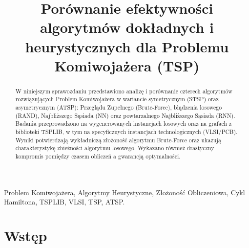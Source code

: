 \documentclass[conference]{IEEEtran}
\begin{document}
    
    \title{Porównanie efektywności algorytmów dokładnych i heurystycznych dla Problemu Komiwojażera (TSP)}
    \author{
        }
    \maketitle
    \thispagestyle{empty}
    \pagestyle{plain}


    \begin{abstract}
        W niniejszym sprawozdaniu przedstawiono analizę i porównanie czterech algorytmów rozwiązujących Problem Komiwojażera w wariancie symetrycznym (STSP) oraz asymetrycznym (ATSP): Przeglądu Zupełnego (Brute-Force), błądzenia losowego (RAND), Najbliższego Sąsiada (NN) oraz powtarzalnego Najbliższego Sąsiada (RNN). Badania przeprowadzono na wygenerowanych instancjach losowych oraz na grafach z biblioteki TSPLIB, w tym na specyficznych instancjach technologicznych (VLSI/PCB). Wyniki potwierdzają wykładniczą złożoność algorytmu Brute-Force oraz ukazują charakterystykę zbieżności algorytmu losowego. Wykazano również drastyczny kompromis pomiędzy czasem obliczeń a gwarancją optymalności.
    \end{abstract}
    \begin{IEEEkeywords}
        Problem Komiwojażera, Algorytmy Heurystyczne, Złożoność Obliczeniowa, Cykl Hamiltona, TSPLIB, VLSI, TSP, ATSP.
    \end{IEEEkeywords}


    \section{Wstęp}
\end{document}
